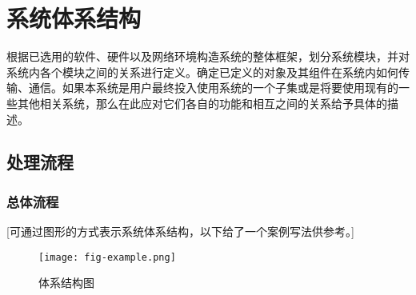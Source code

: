 \chapter{系统体系结构}
根据已选用的软件、硬件以及网络环境构造系统的整体框架，划分系统模块，并对系统内各个模块之间的关系进行定义。确定已定义的对象及其组件在系统内如何传输、通信。如果本系统是用户最终投入使用系统的一个子集或是将要使用现有的一些其他相关系统，那么在此应对它们各自的功能和相互之间的关系给予具体的描述。

\section{处理流程}
\subsection{总体流程}
[可通过图形的方式表示系统体系结构，以下给了一个案例写法供参考。]

\begin{figure}[htbp!]
    \centering
    \texttt{[image: fig-example.png]}
    \caption{体系结构图}
    \label{fig:my_label}
\end{figure}
